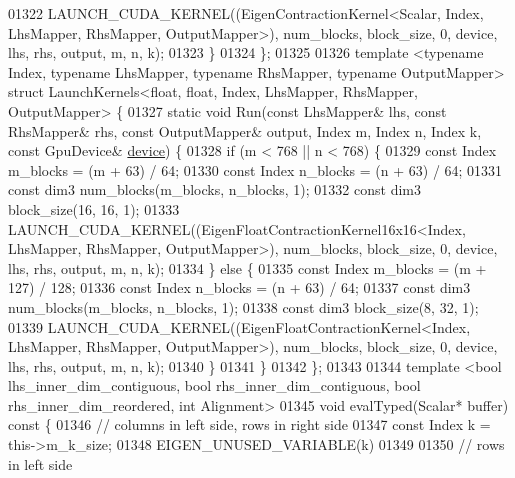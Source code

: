 \begin{DoxyCode}
01322     LAUNCH\_CUDA\_KERNEL((EigenContractionKernel<Scalar, Index, LhsMapper, RhsMapper, OutputMapper>), 
      num\_blocks, block\_size, 0, device, lhs, rhs, output, m, n, k);
01323     \}
01324   \};
01325 
01326   \textcolor{keyword}{template} <\textcolor{keyword}{typename} Index, \textcolor{keyword}{typename} LhsMapper, \textcolor{keyword}{typename} RhsMapper, \textcolor{keyword}{typename} OutputMapper> \textcolor{keyword}{struct }
      LaunchKernels<float, float, Index, LhsMapper, RhsMapper, OutputMapper> \{
01327     \textcolor{keyword}{static} \textcolor{keywordtype}{void} Run(\textcolor{keyword}{const} LhsMapper& lhs, \textcolor{keyword}{const} RhsMapper& rhs, \textcolor{keyword}{const} OutputMapper& output, Index m, Index 
      n, Index k, \textcolor{keyword}{const} GpuDevice& \hyperlink{struct_eigen_1_1_tensor_evaluator_a98b51809ed8f7a1f736eb7b952b9636e}{device}) \{
01328       \textcolor{keywordflow}{if} (m < 768 || n < 768) \{
01329         \textcolor{keyword}{const} Index m\_blocks = (m + 63) / 64;
01330         \textcolor{keyword}{const} Index n\_blocks = (n + 63) / 64;
01331         \textcolor{keyword}{const} dim3 num\_blocks(m\_blocks, n\_blocks, 1);
01332         \textcolor{keyword}{const} dim3 block\_size(16, 16, 1);
01333         LAUNCH\_CUDA\_KERNEL((EigenFloatContractionKernel16x16<Index, LhsMapper, RhsMapper, OutputMapper>), 
      num\_blocks, block\_size, 0, device, lhs, rhs, output, m, n, k);
01334       \} \textcolor{keywordflow}{else} \{
01335         \textcolor{keyword}{const} Index m\_blocks = (m + 127) / 128;
01336         \textcolor{keyword}{const} Index n\_blocks = (n + 63) / 64;
01337         \textcolor{keyword}{const} dim3 num\_blocks(m\_blocks, n\_blocks, 1);
01338         \textcolor{keyword}{const} dim3 block\_size(8, 32, 1);
01339         LAUNCH\_CUDA\_KERNEL((EigenFloatContractionKernel<Index, LhsMapper, RhsMapper, OutputMapper>), 
      num\_blocks, block\_size, 0, device, lhs, rhs, output, m, n, k);
01340       \}
01341     \}
01342   \};
01343 
01344   \textcolor{keyword}{template} <\textcolor{keywordtype}{bool} lhs\_inner\_dim\_contiguous, \textcolor{keywordtype}{bool} rhs\_inner\_dim\_contiguous, \textcolor{keywordtype}{bool} rhs\_inner\_dim\_reordered, \textcolor{keywordtype}{int}
       Alignment>
01345   \textcolor{keywordtype}{void} evalTyped(Scalar* buffer)\textcolor{keyword}{ const }\{
01346     \textcolor{comment}{// columns in left side, rows in right side}
01347     \textcolor{keyword}{const} Index k = this->m\_k\_size;
01348     EIGEN\_UNUSED\_VARIABLE(k)
01349 
01350     \textcolor{comment}{// rows in left side}

\end{DoxyCode}
